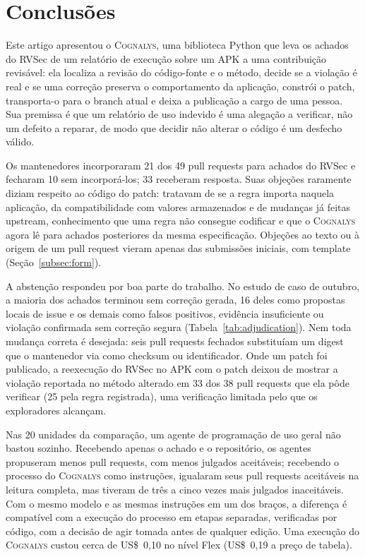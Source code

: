 \documentclass[conference]{IEEEtran}
\newcommand{\system}{\textsc{Cognalys}}
\begin{document}
\section{Conclusões}
\label{sec:conclusion}

Este artigo apresentou o \system{}, uma biblioteca Python que leva os achados do RVSec de
um relatório de execução sobre um APK a uma contribuição revisável: ela localiza a revisão
do código-fonte e o método, decide se a violação é real e se uma correção preserva o
comportamento da aplicação, constrói o patch, transporta-o para o branch atual e deixa
a publicação a cargo de uma pessoa. Sua premissa é que um relatório de uso indevido é uma
alegação a verificar, não um defeito a reparar, de modo que decidir não alterar o código
é um desfecho válido.

Os mantenedores incorporaram 21 dos 49 pull requests para achados do RVSec e fecharam 10
sem incorporá-los; 33 receberam resposta. Suas objeções raramente diziam respeito ao
código do patch: tratavam de se a regra importa naquela aplicação, da compatibilidade
com valores armazenados e de mudanças já feitas upstream, conhecimento que uma regra não
consegue codificar e que o \system{} agora lê para achados posteriores da mesma
especificação. Objeções ao texto ou à origem de um
pull request vieram apenas das submissões iniciais, com template
(Seção~\ref{subsec:form}).

A abstenção respondeu por boa parte do trabalho. No estudo de caso de outubro, a maioria
dos achados terminou sem correção gerada, 16 deles como propostas locais de issue e os
demais como falsos positivos, evidência insuficiente ou violação confirmada sem correção
segura (Tabela~\ref{tab:adjudication}). Nem toda mudança correta é desejada: seis pull
requests fechados substituíam um digest que o mantenedor via como checksum ou
identificador. Onde um patch foi publicado, a reexecução do RVSec no APK
com o patch deixou de mostrar a violação reportada no método alterado em 33 dos 38 pull
requests que ela pôde verificar (25 pela regra registrada), uma verificação limitada pelo
que os exploradores alcançam.

Nas 20 unidades da comparação, um agente de programação de uso geral não bastou sozinho. Recebendo apenas o achado e o
repositório, os agentes propuseram menos pull requests, com menos julgados aceitáveis;
recebendo o processo do \system{} como instruções, igualaram seus pull requests
aceitáveis na leitura completa, mas tiveram de três a cinco vezes mais julgados inaceitáveis.
Com o mesmo modelo e as mesmas instruções em um dos braços, a diferença é compatível com a
execução do processo em etapas separadas, verificadas por código, com a decisão de agir
tomada antes de qualquer edição. Uma execução do \system{} custou cerca de US\$~0,10 no nível Flex
(US\$~0,19 a preço de tabela).
\end{document}
